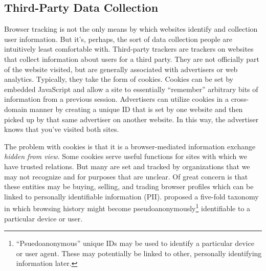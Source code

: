 \subsection{Third-Party Data Collection}
\label{third-partydatacollection}

Browser tracking is not the only means by which websites identify and collection user information. But it's, perhaps, the sort of data collection people are intuitively least comfortable with. Third-party trackers are trackers on websites that collect information about users for a third party. They are not officially part of the website visited, but are generally associated with advertisers or web analytics. Typically, they take the form of cookies. Cookies can be set by embedded JavaScript and allow a site to essentially ``remember'' arbitrary bits of information from a previous session. Advertisers can utilize cookies in a cross-domain manner by creating a unique ID that is set by one website and then picked up by that same advertiser on another website. In this way, the advertiser knows that you've visited both sites. 

The problem with cookies is that it is a browser-mediated information exchange \emph{hidden from view}. Some cookies serve useful functions for sites with which we have trusted relations. But many are set and tracked by organizations that we may not recognize and for purposes that are unclear. Of great concern is that these entities may be buying, selling, and trading browser profiles which can be linked to personally identifiable information (PII).
 \cite{Narayanan:2011tv}  proposed a five-fold taxonomy in which browsing history might become pseudoanonymously\footnote{``Psuedoanonymous'' unique IDs may be used to identify a particular device or user agent. These may potentially be linked to other, personally identifying information later.} identifiable to a particular device or user.

